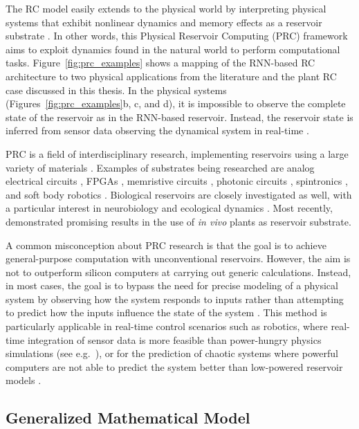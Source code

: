 
The RC model easily extends to the physical world by interpreting physical systems that exhibit nonlinear dynamics and memory effects as a reservoir substrate  \citep{nakajima_physical_2020}. 
In other words, this Physical Reservoir Computing (PRC) framework aims to exploit dynamics found in the natural world to perform computational tasks. 
\mbox{Figure \ref{fig:prc_examples}} shows a mapping of the RNN-based RC architecture to two physical applications from the literature and the plant RC case discussed in this thesis.
In the physical systems (\mbox{Figures \ref{fig:prc_examples}}b, c, and d), it is impossible to observe the complete state of the reservoir as in the RNN-based reservoir. 
Instead, the reservoir state is inferred from sensor data observing the dynamical system in real-time \citep{burms_reward-modulated_2015, nakajima_information_2015}.



PRC is a field of interdisciplinary research, implementing reservoirs using a large variety of materials \citep{tanaka_recent_2019}.
Examples of substrates being researched are analog electrical circuits \citep{soriano_minimal_2015, zhao_novel_2016}, FPGAs \citep{antonik_application_2018}, memristive circuits \citep{walter_neuromorphic_2015}, photonic circuits \citep{van_der_sande_advances_2017}, spintronics \citep{torrejon_neuromorphic_2017}, and soft body robotics \citep{caluwaerts_body_2011, caluwaerts_design_2014, nakajima_soft_2013}.
Biological reservoirs are closely investigated as well, with a particular interest in neurobiology \citep{hafizovic_cmos-based_2007, hinaut_real-time_2013} and ecological dynamics \citep{jones_is_2007, didovyk_distributed_2015,ushio_computational_2021}. 
Most recently, \citet{pieters_plants_2021} demonstrated promising results in the use of \textit{in vivo} plants as reservoir substrate.


A common misconception about PRC research is that the goal is to achieve general-purpose computation with unconventional reservoirs. 
However, the aim is not to outperform silicon computers at carrying out generic calculations. 
Instead, in most cases, the goal is to bypass the need for precise modeling of a physical system by observing how the system responds to inputs rather than attempting to predict how the inputs influence the state of the system \citep{nakajima_physical_2020}.
This method is particularly applicable in real-time control scenarios such as robotics, where real-time integration of sensor data is more feasible than power-hungry physics simulations (see e.g.\ \cite{caluwaerts_design_2014, burms_reward-modulated_2015}), 
or for the prediction of chaotic systems where powerful computers are not able to predict the system better than low-powered reservoir models \citep{gauthier_next_2021}.


\subsection{Generalized Mathematical Model} \label{section:rc-general}

